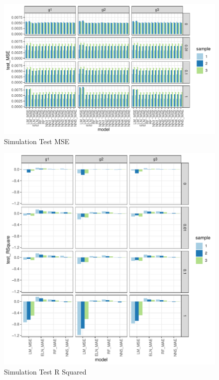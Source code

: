 \documentclass[11pt, a4paper, table]{article}
\begin{document}
\begin{figure}
	\includegraphics{simulation_test_mse.pdf}
	\caption{Simulation Test MSE}
\end{figure}

\begin{figure}
	\includegraphics{simulation_test_rsquare.pdf}
	\caption{Simulation Test R Squared}
\end{figure}
\end{document}
